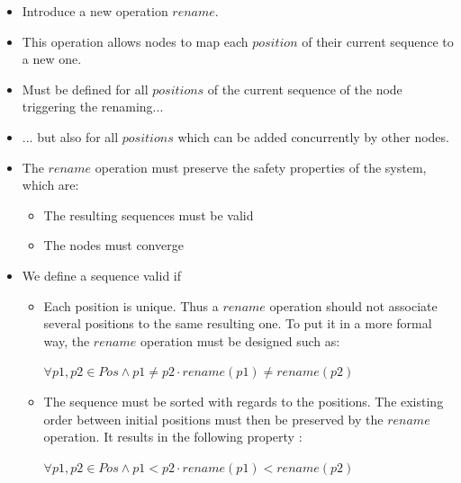 \documentclass{article}
\theoremstyle{definition}
\theoremstyle{definition}
\theoremstyle{definition}
\theoremstyle{definition}
\begin{document}
\begin{itemize}
    \item Introduce a new operation $rename$.
    \item This operation allows nodes to map each $position$ of their current sequence to a new one.
    \item Must be defined for all $positions$ of the current sequence of the node triggering the renaming...
    \item ... but also for all $positions$ which can be added concurrently by other nodes.
    \item The $rename$ operation must preserve the safety properties of the system, which are:
    \begin{itemize}
        \item The resulting sequences must be valid
        \item The nodes must converge
    \end{itemize}
    \item We define a sequence valid if
    \begin{itemize}
        \item Each position is unique. Thus a $rename$ operation should not associate several positions to the same resulting one. To put it in a more formal way, the $rename$ operation must be designed such as:

        \begin{center}
            $\forall p1, p2 \in Pos \land p1 \neq p2 \cdot rename(p1) \neq rename(p2)$
        \end{center}

        \item The sequence must be sorted with regards to the positions. The existing order between initial positions must then be preserved by the $rename$ operation. It results in the following property :

        \begin{center}
            $\forall p1, p2 \in Pos \land p1 < p2 \cdot rename(p1) < rename(p2)$
        \end{center}

    \end{itemize}


\end{itemize}
\end{document}

